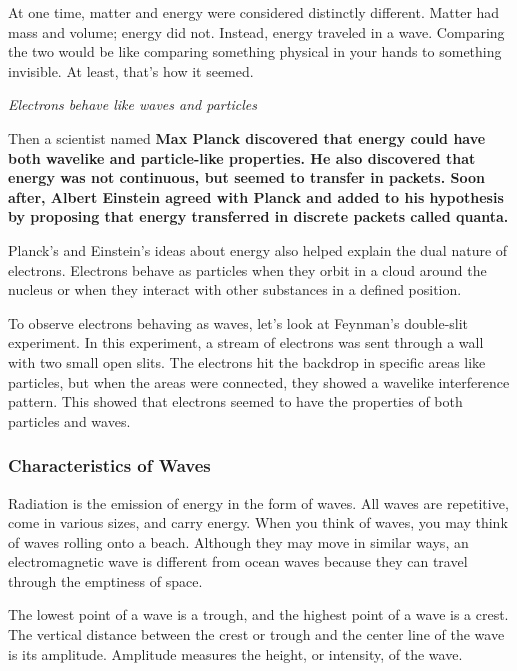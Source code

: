 
At one time, matter and energy were considered distinctly different. Matter had
mass and volume; energy did not. Instead, energy traveled in a wave. Comparing
the two would be like comparing something physical in your hands to something
invisible. At least, that's how it seemed.

\begin{displayquote}
    \it{Electrons behave like waves and particles}
\end{displayquote}

Then a scientist named \bf{Max Planck} discovered that energy could have
both wavelike and particle-like properties. He also discovered that energy was
not continuous, but seemed to transfer in packets. Soon after, Albert Einstein
agreed with Planck and added to his hypothesis by proposing that energy
transferred in discrete packets called quanta.

Planck's and Einstein's ideas about energy also helped explain the dual nature
of electrons. Electrons behave as particles when they orbit in a cloud around
the nucleus or when they interact with other substances in a defined position.

To observe electrons behaving as waves, let's look at Feynman's double-slit
experiment. In this experiment, a stream of electrons was sent through a wall
with two small open slits. The electrons hit the backdrop in specific areas like
particles, but when the areas were connected, they showed a wavelike
interference pattern. This showed that electrons seemed to have the properties
of both particles and waves.

\subsubsection*{Characteristics of Waves}

Radiation is the emission of energy in the form of waves. All waves are
repetitive, come in various sizes, and carry energy. When you think of waves,
you may think of waves rolling onto a beach. Although they may move in similar
ways, an electromagnetic wave is different from ocean waves because they can
travel through the emptiness of space.

The lowest point of a wave is a trough, and the highest point of a wave is a
crest. The vertical distance between the crest or trough and the center line of
the wave is its amplitude. Amplitude measures the height, or intensity, of the
wave.

